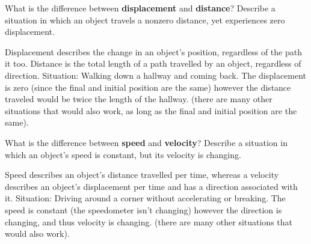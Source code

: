 \documentclass[12pt]{exam}
\begin{document}
\begin{questions}

	
	\question
	What is the difference between \textbf{displacement} and \textbf{distance}? Describe a situation in which an object travels a nonzero distance, yet experiences zero displacement.
	\begin{TheSolution}
		Displacement describes the change in an object's position, regardless of the path it too. Distance is the total length of a path travelled by an object, regardless of direction.
		Situation: Walking down a hallway and coming back. The displacement is zero (since the final and initial position are the same) however the distance traveled would be twice the length of the hallway. (there are many other situations that would also work, as long as the final and initial position are the same).
	\end{TheSolution}
	
	\question
	What is the difference between \textbf{speed} and \textbf{velocity}? Describe a situation in which an object's speed is constant, but its velocity is changing.
	\begin{TheSolution}
		Speed describes an object's distance travelled per time, whereas a velocity describes an object's displacement per time and has a direction associated with it.
		Situation: Driving around a corner without accelerating or breaking. The speed is constant (the speedometer isn't changing) however the direction is changing, and thus velocity is changing. (there are many other situations that would also work).
	\end{TheSolution}	


\end{questions}
\end{document}
